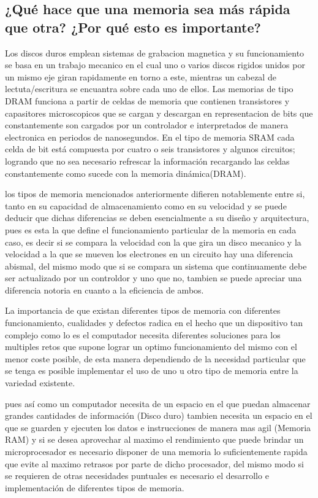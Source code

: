 \documentclass{article}
\begin{document}
\subsection{¿Qué hace que una memoria sea más rápida que otra? ¿Por qué esto es importante?}

Los discos duros emplean sistemas de grabacion magnetica y su funcionamiento se basa en un trabajo mecanico en el cual uno o varios discos rigidos unidos por un mismo eje giran rapidamente en torno a este, mientras un cabezal de lectuta/escritura se encuantra sobre cada uno de ellos.
Las memorias de tipo DRAM funciona a partir de celdas de memoria que contienen transistores y capasitores microscopicos que se cargan y descargan en representacion de bits que constantemente son cargados por un controlador e interpretados de manera electronica en periodos de nanosegundos.
En el tipo de memoria SRAM cada celda de bit está compuesta por cuatro o seis transistores y algunos circuitos; logrando que no sea necesario refrescar la información recargando las celdas constantemente como sucede con la memoria dinámica(DRAM).

los tipos de memoria mencionados anteriormente  difieren notablemente entre si, tanto en su capacidad de almacenamiento como en su velocidad y se puede deducir que dichas diferencias se deben esencialmente a su diseño y arquitectura, pues es esta la que define el funcionamiento particular de la memoria en cada caso, es decir si se compara la velocidad con la que gira un disco mecanico y la velocidad a la que se mueven los electrones en un circuito hay una diferencia abismal, del mismo modo que si se compara un sistema que continuamente debe ser actualizado por un controldor y uno que no, tambien se puede apreciar una diferencia notoria en cuanto a la eficiencia de ambos.

\vspace{0.5cm}

La importancia de que existan diferentes tipos de memoria con diferentes funcionamiento, cualidades y defectos radica en el hecho que un dispositivo tan complejo como lo es el computador necesita diferentes soluciones para los multiples retos que supone lograr un optimo funcionamiento del mismo con el menor coste posible, de esta manera dependiendo de la necesidad particular que se tenga es posible implementar el uso de uno u otro tipo de memoria entre la variedad existente.



pues así como un computador necesita de un espacio en el que puedan almacenar grandes cantidades de información (Disco duro) tambien necesita un espacio en el que se guarden y ejecuten los datos e instrucciones de manera mas agil (Memoria RAM) y si se desea aprovechar al maximo el rendimiento que puede brindar un microprocesador es necesario disponer de una memoria lo suficientemente rapida que evite al maximo retrasos por parte de dicho procesador, del mismo modo si se requieren de otras necesidades puntuales es necesario el desarrollo e implementación de diferentes tipos de memoria.
\end{document}
